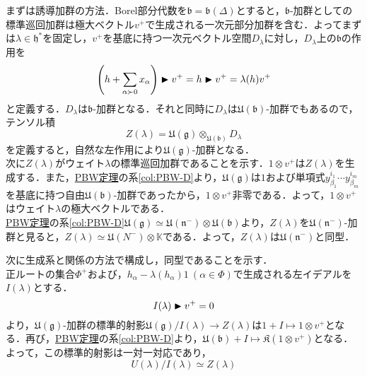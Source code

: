 \documentclass[rep_main]{subfiles}
\begin{document}
まずは誘導加群の方法．Borel部分代数を$\mathfrak{b} = \mathfrak{b}(\Delta)$とすると，$\mathfrak{b}$-加群としての標準巡回加群は極大ベクトル$v^+$で生成される一次元部分加群を含む．よってまずは$\lambda \in \mathfrak{h}^*$を固定し，$v^+$を基底に持つ一次元ベクトル空間$D_\lambda$に対し，$D_\lambda$上の$\mathfrak{b}$の作用を
\begin{equation}
	\Biggl(h + \sum_{\alpha \succ 0}x_\alpha \Biggr) \blacktriangleright v^+ = h \blacktriangleright v^+ = \lambda(h) v^+
\end{equation}
と定義する．$D_\lambda$は$\mathfrak{b}$-加群となる．それと同時に$D_\lambda$は$\mathfrak{U}(\mathfrak{b})$-加群でもあるので，テンソル積
\begin{equation}
	Z(\lambda) = \mathfrak{U}(\mathfrak{g}) \otimes_{\mathfrak{U}(\mathfrak{b})} D_\lambda
\end{equation}
を定義すると，自然な左作用により$\mathfrak{U}(\mathfrak{g})$-加群となる．\\
次に$Z(\lambda)$がウェイト$\lambda$の標準巡回加群であることを示す．$1 \otimes v^+$は$Z(\lambda)$を生成する．また，\hyperref[thm:PBW]{PBW定理}の系\ref{col:PBW-D}より，$\mathfrak{U}(\mathfrak{g})$は$1$および単項式$y_{\beta_1}^{i_1}\cdots y_{\beta_m}^{i_m}$を基底に持つ自由$\mathfrak{U}(\mathfrak{b})$-加群であったから，$1 \otimes v^+$非零である．よって，$1 \otimes v^+$はウェイト$\lambda$の極大ベクトルである．\\
\hyperref[thm:PBW]{PBW定理}の系\ref{col:PBW-D}$\mathfrak{U}(\mathfrak{g}) \simeq \mathfrak{U}(\mathfrak{n}^-) \otimes \mathfrak{U}(\mathfrak{b})$より，$Z(\lambda)$を$\mathfrak{U}(\mathfrak{n}^-)$-加群と見ると，$Z(\lambda) \simeq \mathfrak{U}(N^-) \otimes \mathbb{K}$である．よって，$Z(\lambda)$は$\mathfrak{U}(\mathfrak{n}^-)$と同型．

次に生成系と関係の方法で構成し，同型であることを示す．\\
正ルートの集合$\Phi^+$および，$h_\alpha - \lambda(h_\alpha)1\ (\alpha \in \Phi)$で生成される左イデアルを$I(\lambda)$とする．
\begin{equation}
	I(\lambda) \blacktriangleright v^+ = 0
\end{equation}
より，$\mathfrak{U}(\mathfrak{g})$-加群の標準的射影$\mathfrak{U}(\mathfrak{g}) / I(\lambda) \to Z(\lambda)$は$1 + I \mapsto 1\otimes v^+$となる．再び，\hyperref[thm:PBW]{PBW定理}の系\ref{col:PBW-D}より，$\mathfrak{U}(\mathfrak{b}) + I \mapsto \mathfrak{K}(1\otimes v^+)$となる．よって，この標準的射影は一対一対応であり，
\begin{equation}
	U(\lambda) / I(\lambda) \simeq Z(\lambda)
\end{equation}
\end{document}
